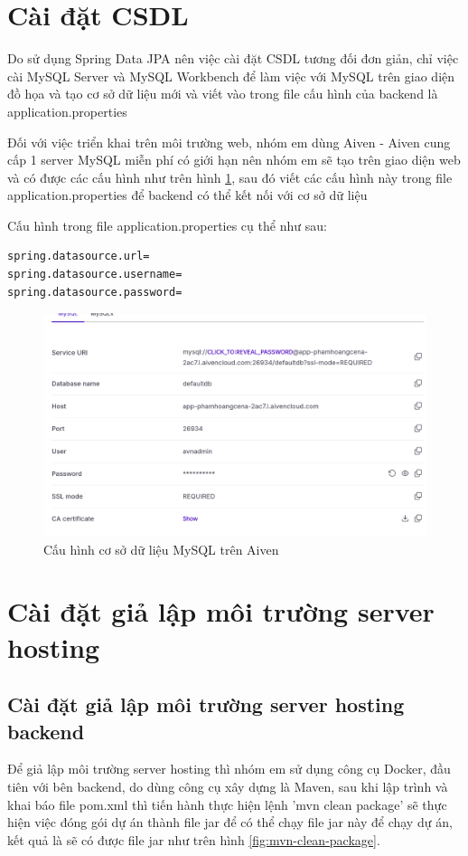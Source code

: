 \documentclass[../BTL.tex]{subfiles}
\begin{document}
\section{ Cài đặt CSDL}
Do sử dụng Spring Data JPA nên việc cài đặt CSDL tương đối đơn giản, chỉ việc cài MySQL Server và MySQL Workbench để làm việc với MySQL trên giao diện đồ họa và tạo cơ sở dữ liệu mới và viết vào trong file cấu hình của backend là application.properties

Đối với việc triển khai trên môi trường web, nhóm em dùng Aiven - Aiven cung cấp 1 server MySQL miễn phí có giới hạn nên nhóm em sẽ tạo trên giao diện web và có được các cấu hình như trên hình \ref{fig:aiven-mysql-config}, sau đó viết các cấu hình này trong file application.properties để backend có thể kết nối với cơ sở dữ liệu


Cấu hình trong file application.properties cụ thể như sau:
\begin{verbatim}
spring.datasource.url=
spring.datasource.username=
spring.datasource.password=
\end{verbatim}

\begin{figure}
    \centering
    \includegraphics[width=1\linewidth]{Hinhve/aiven-mysql-config.png}
    \caption{ Cấu hình cơ sở dữ liệu MySQL trên Aiven}
    \label{fig:aiven-mysql-config}
\end{figure}
\section{ Cài đặt giả lập môi trường server hosting}
\subsection{ Cài đặt giả lập môi trường server hosting backend}
Để giả lập môi trường server hosting thì nhóm em sử dụng công cụ Docker, đầu tiên với bên backend, do dùng công cụ xây dựng là Maven, sau khi lập trình và khai báo file pom.xml thì tiến hành thực hiện lệnh 'mvn clean package' sẽ thực hiện việc đóng gói dự án thành file jar để có thể chạy file jar này để chạy dự án, kết quả là sẽ có được file jar như trên hình \ref{fig:mvn-clean-package}.
\end{document}
